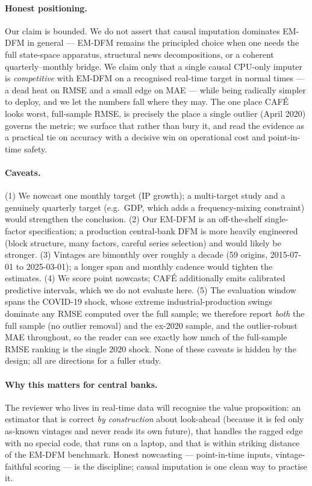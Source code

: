 \documentclass[11pt]{article}
\newcommand{\cafe}{CAF\'E}
\begin{document}
\paragraph{Honest positioning.} Our claim is bounded. We do not assert that causal
imputation dominates EM-DFM in general --- EM-DFM remains the principled choice when one
needs the full state-space apparatus, structural news decompositions, or a coherent
quarterly--monthly bridge. We claim only that a single causal CPU-only imputer is
\emph{competitive} with EM-DFM on a recognised real-time target in normal times --- a dead
heat on RMSE and a small edge on MAE --- while being radically simpler to deploy, and we
let the numbers fall where they may. The one place \cafe{} looks worst, full-sample RMSE,
is precisely the place a single outlier (April 2020) governs the metric; we surface that
rather than bury it, and read the evidence as a practical tie on accuracy with a decisive
win on operational cost and point-in-time safety.

\paragraph{Caveats.} (1) We nowcast one monthly target (IP growth); a multi-target study
and a genuinely quarterly target (e.g.\ GDP, which adds a frequency-mixing constraint)
would strengthen the conclusion. (2) Our EM-DFM is an off-the-shelf single-factor
specification; a production central-bank DFM is more heavily engineered (block structure,
many factors, careful series selection) and would likely be stronger. (3) Vintages are
bimonthly over roughly a decade (59 origins, 2015-07-01 to 2025-03-01); a longer span and monthly
cadence would tighten the estimates. (4) We score point nowcasts; \cafe{} additionally
emits calibrated predictive intervals, which we do not evaluate here. (5) The evaluation
window spans the COVID-19 shock, whose extreme industrial-production swings dominate any
RMSE computed over the full sample; we therefore report \emph{both} the full sample (no
outlier removal) and the ex-2020 sample, and the outlier-robust MAE throughout, so the
reader can see exactly how much of the full-sample RMSE ranking is the single 2020 shock.
None of these caveats is hidden by the design; all are directions for a fuller study.

\paragraph{Why this matters for central banks.} The reviewer who lives in real-time data
will recognise the value proposition: an estimator that is correct \emph{by construction}
about look-ahead (because it is fed only as-known vintages and never reads its own future),
that handles the ragged edge with no special code, that runs on a laptop, and that is
within striking distance of the EM-DFM benchmark. Honest nowcasting --- point-in-time
inputs, vintage-faithful scoring --- is the discipline; causal imputation is one clean way
to practise it.
\end{document}
